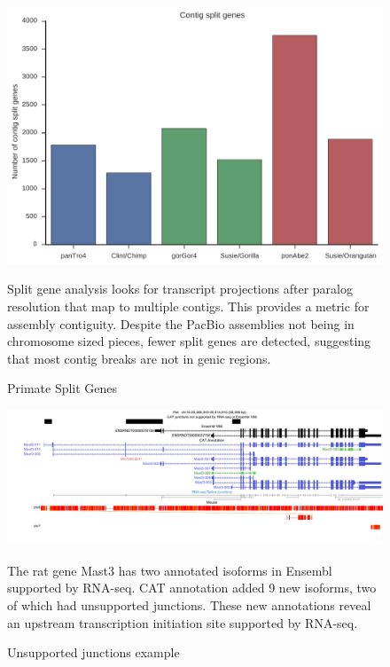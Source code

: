 \documentclass[fleqn,10pt]{wlscirep}
\begin{document}
\begin{figure}
\centering
\includegraphics[width=\textwidth,height=\textheight,keepaspectratio]{split_genes.pdf}
\caption{Primate Split Genes}
\label{supp_fig:primate_split_genes}
Split gene analysis looks for transcript projections after paralog resolution that map to multiple contigs. This provides a metric for assembly contiguity. Despite the PacBio assemblies not being in chromosome sized pieces, fewer split genes are detected, suggesting that most contig breaks are not in genic regions.
\end{figure}

\begin{figure}
\centering
\includegraphics[width=\textwidth,height=\textheight,keepaspectratio,angle=90]{mast3_example.pdf}
\caption{Unsupported junctions example}
The rat gene Mast3 has two annotated isoforms in Ensembl supported by RNA-seq. CAT annotation added 9 new isoforms, two of which had unsupported junctions. These new annotations reveal an upstream transcription initiation site supported by RNA-seq. 
\label{supp_fig:unsupported_junctions}
\end{figure}
\end{document}
